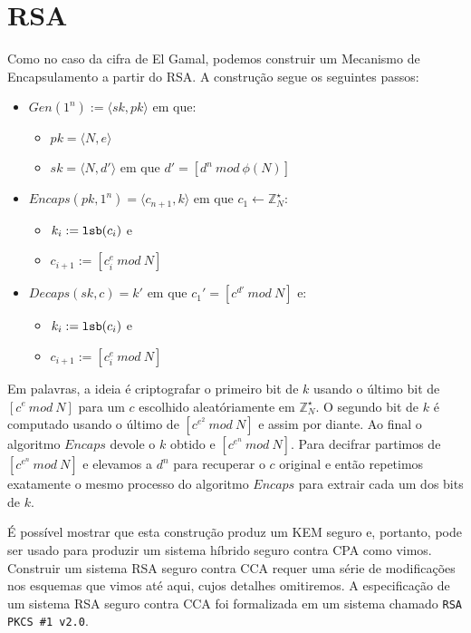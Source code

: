 \section{RSA}
\label{sec:rsa}

Como no caso da cifra de El Gamal, podemos construir um Mecanismo de Encapsulamento a partir do RSA.
A construção segue os seguintes passos:
\begin{itemize}
\item $Gen(1^n) := \langle sk, pk \rangle$ em que:
\begin{itemize}
\item $pk = \langle N, e \rangle$
\item $sk = \langle N, d' \rangle$ em que $d' = [d^n\ mod\ \phi(N)]$
\end{itemize}
\item $Encaps(pk, 1^n) = \langle c_{n+1}, k \rangle$ em que $c_1 \leftarrow \mathbb{Z}_N^\star$:
\begin{itemize}
\item $k_i := \textrm{\tt lsb}(c_i)$ e
\item $c_{i+1} := [c_i^e\ mod\ N]$
\end{itemize}
\item $Decaps(sk, c) = k'$ em que $c_1' = [c^{d'}\ mod\ N]$ e:
\begin{itemize}
\item $k_i := \textrm{\tt lsb}(c_i)$ e
\item $c_{i+1} := [c_i^e\ mod\ N]$
\end{itemize}
\end{itemize}

Em palavras, a ideia é criptografar o primeiro bit de $k$ usando o último bit de $[c^e\ mod\ N]$ para um $c$ escolhido aleatóriamente em $\mathbb{Z}_N^\star$.
O segundo bit de $k$ é computado usando o último de $[c^{e^2}\ mod\ N]$ e assim por diante.
Ao final o algoritmo $Encaps$ devole o $k$ obtido e $[c^{e^n}\ mod\ N]$.
Para decifrar partimos de $[c^{e^n}\ mod\ N]$ e elevamos a $d^n$ para recuperar o $c$ original e então repetimos exatamente o mesmo processo do algoritmo $Encaps$ para extrair cada um dos bits de $k$.

É possível mostrar que esta construção produz um KEM seguro e, portanto, pode ser usado para produzir um sistema híbrido seguro contra CPA como vimos.
Construir um sistema RSA seguro contra CCA requer uma série de modificações nos esquemas que vimos até aqui, cujos detalhes omitiremos.
A especificação de um sistema RSA seguro contra CCA foi formalizada em um sistema chamado {\tt RSA PKCS \#1 v2.0}.